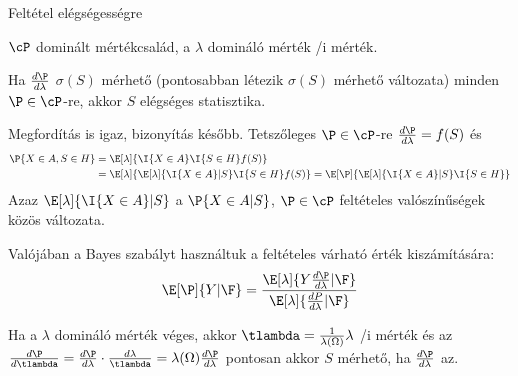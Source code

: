 \documentclass[aspectratio=169,notheorems,9pt,\option]{beamer}
\begin{document}
\begin{frame}{Feltétel elégségességre}
  \begin{proposition}
    $\cP$ dominált mértékcsalád, a $\lambda$ domináló mérték \val/i mérték.
  
    Ha $\frac{d\P}{d\lambda}$ $\sigma(S)$ mérhető (pontosabban létezik $\sigma(S)$ mérhető változata) minden $\P\in\cP$-re,
    akkor $S$ elégséges statisztika.
  \end{proposition}
  \continue 
  Megfordítás is igaz, bizonyítás később. 
  \pause
  Tetszőleges $\P\in\cP$-re $\frac{d\P}{d\lambda}=f(S)$ és
  \begin{align*}
    \P{X\in A,S\in H}&=\E[\lambda]{\I{X\in A}\I{S\in H}f(S)}\\
    &=\E[\lambda]{\E[\lambda]{\I{X\in A}|S}\I{S\in H}f(S)}
    =\E[\P]{\E[\lambda]{\I{X\in A}|S}\I{S\in H}}
  \end{align*}
  Azaz $\E[\lambda]{\I{X\in A}|S}$ a $\P{X\in A|S}$, $\P\in\cP$  feltételes valószínűségek közös változata.
    
  \pause
    Valójában a Bayes szabályt használtuk a feltételes várható érték kiszámítására:
    \begin{displaymath}
      \E[\P]{Y|\F}=\frac{\E[\lambda]{Y\frac{d\P}{d\lambda}|\F}}{\E[\lambda]{\frac{dP}{d\lambda}|\F}}
    \end{displaymath}
  \pause

  Ha a $\lambda$ domináló mérték véges, akkor $\tlambda=\frac{1}{\lambda(\Omega)}\lambda$ \val/i mérték és az 
    $\frac{d\P}{d\tlambda}=\frac{d\P}{d\lambda}\cdot\frac{d\lambda}{\tlambda}=\lambda(\Omega)\frac{d\P}{d\lambda}$
  pontosan akkor $S$ mérhető, ha $\frac{d\P}{d\lambda}$ az.  
\end{frame}
\end{document}
